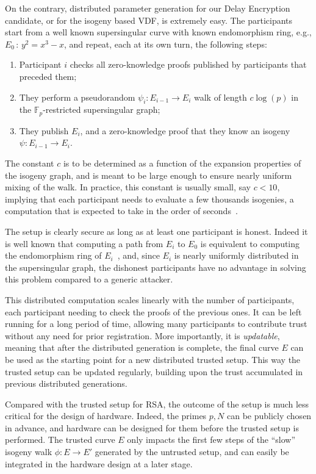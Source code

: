 \documentclass{llncs}
\newcommand{\F}{\mathbb{F}}
\begin{document}
On the contrary, distributed parameter generation for our Delay
Encryption candidate, or for the isogeny based VDF, is extremely
easy. %
The participants start from a well known supersingular curve with
known endomorphism ring, e.g., $E_0\,:\,y^2=x^3-x$, and repeat, each
at its own turn, the following steps:
\begin{enumerate}
\item Participant $i$ checks all zero-knowledge proofs published by
  participants that preceded them;
\item They perform a pseudorandom $\psi_i:E_{i-1}\to E_i$
  walk of length $c\log(p)$ in the $\F_p$-restricted supersingular
  graph;
\item They publish $E_i$, and a zero-knowledge proof that they know an
  isogeny $\psi:E_{i-1}\to E_i$.
\end{enumerate}

The constant $c$ is to be determined as a function of the expansion
properties of the isogeny graph, and is meant to be large enough to
ensure nearly uniform mixing of the walk. %
In practice, this constant is usually small, say $c<10$, implying that
each participant needs to evaluate a few thousands isogenies, a
computation that is expected to take in the order of
seconds~\cite{10.1007/978-3-030-03332-3_15}.

The setup is clearly secure as long as at least one participant is
honest. %
Indeed it is well known that computing a path from $E_i$ to $E_0$ is
equivalent to computing the endomorphism ring of
$E_i$~\cite{kohel2014quaternion,10.1007/978-3-319-78372-7_11}, and,
since $E_i$ is nearly uniformly distributed in the supersingular graph, the
dishonest participants have no advantage in solving this problem
compared to a generic attacker.

This distributed computation scales linearly with the number of
participants, each participant needing to check the proofs of the
previous ones. %
It can be left running for a long period of time, allowing many
participants to contribute trust without any need for prior
registration. %
More importantly, it is \emph{updatable}, meaning that after the
distributed generation is complete, the final curve $E$ can be used as
the starting point for a new distributed trusted setup. %
This way the trusted setup can be updated regularly, building upon the
trust accumulated in previous distributed generations.

Compared with the trusted setup for RSA, the outcome of the setup is
much less critical for the design of hardware. %
Indeed, the primes $p,N$ can be publicly chosen in advance, and
hardware can be designed for them before the trusted setup is
performed. %
The trusted curve $E$ only impacts the first few steps of the ``slow''
isogeny walk $\phi:E\to E'$ generated by the untrusted setup, and can
easily be integrated in the hardware design at a later stage.
\end{document}
